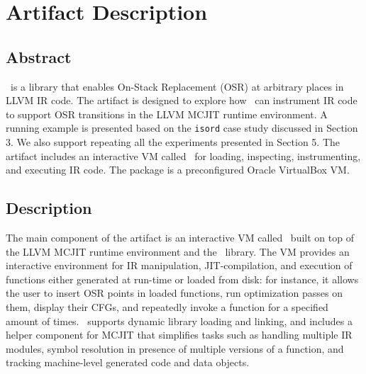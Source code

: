 
%
%



\appendix
\section{Artifact Description}



\subsection{Abstract}

\osrkit\ is a library that enables On-Stack Replacement (OSR) at arbitrary places in LLVM IR code. The artifact is designed to explore how \osrkit\ can instrument IR code to support OSR transitions in the LLVM MCJIT runtime environment. A running example is presented based on the \texttt{isord} case study discussed in Section 3. We also support repeating all the experiments presented in Section 5. The artifact includes an interactive VM called \tinyvm\ for loading, inspecting, instrumenting, and executing IR code. The package is a preconfigured Oracle VirtualBox VM.


\subsection{Description}

The main component of the artifact is an interactive VM called \tinyvm\ built on top of the LLVM MCJIT runtime environment and the \osrkit\ library. The VM provides an interactive environment for IR manipulation, JIT-compilation, and execution of functions either generated at run-time or loaded from disk: for instance, it allows the user to insert OSR points in loaded functions, run optimization passes on them, display their CFGs, and repeatedly invoke a function for a specified amount of times. \tinyvm\ supports dynamic library loading and linking, and includes a helper component for MCJIT that simplifies tasks such as handling multiple IR modules, symbol resolution in presence of multiple versions of a function, and tracking machine-level generated code and data objects.

